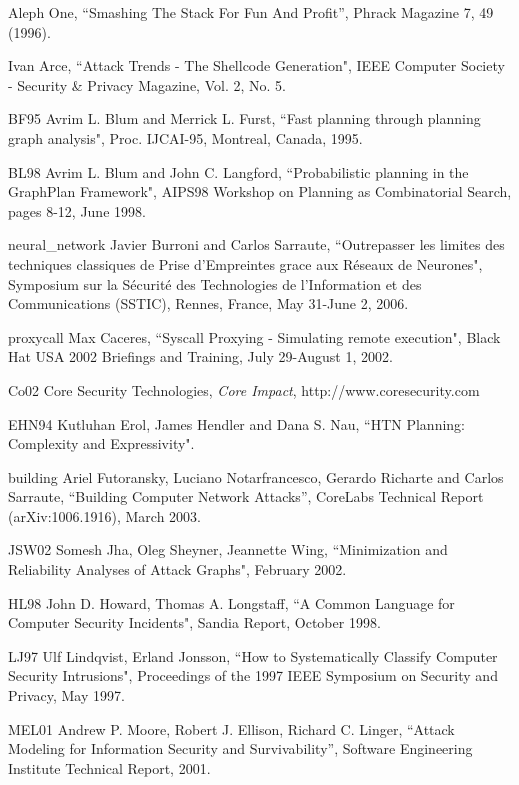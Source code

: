 \documentclass{llncs}
\begin{document}
\begin{thebibliography}{10}

  Aleph One,
``Smashing The Stack For Fun And Profit'',
Phrack Magazine 7, 49 (1996).

  Ivan Arce, 
``Attack Trends - The Shellcode Generation",
 IEEE Computer Society - Security \& Privacy Magazine, Vol. 2, No. 5.

\bibitem
{BF95}  Avrim L. Blum and Merrick L. Furst,
``Fast planning through planning graph analysis",
Proc. IJCAI-95, Montreal, Canada, 1995.

\bibitem
{BL98}  Avrim L. Blum and John C. Langford,
``Probabilistic planning in the GraphPlan Framework",
AIPS98 Workshop on Planning as Combinatorial Search, pages 8-12, June 1998.

\bibitem
{neural_network}  Javier Burroni and Carlos Sarraute,
``Outrepasser les limites des techniques classiques de Prise d'Empreintes grace aux R\'eseaux de Neurones",
Symposium sur la S\'ecurit\'e des Technologies de l'Information et des Communications (SSTIC), 
Rennes, France, May 31-June 2, 2006.

\bibitem
{proxycall}  Max Caceres, 
``Syscall Proxying - Simulating remote execution",
Black Hat USA 2002 Briefings and Training, July 29-August 1, 2002.

\bibitem
{Co02}  Core Security Technologies,
{\em Core Impact},
http://www.coresecurity.com
 
\bibitem
{EHN94}  Kutluhan Erol, James Hendler and Dana S. Nau,
``HTN Planning: Complexity and Expressivity".

\bibitem
{building}  Ariel Futoransky, Luciano Notarfrancesco, Gerardo Richarte and Carlos Sarraute, 
``Building Computer Network Attacks'', 
CoreLabs Technical Report (arXiv:1006.1916), March 2003.

\bibitem
{JSW02}  Somesh Jha, Oleg Sheyner, Jeannette Wing,
``Minimization and Reliability Analyses of Attack Graphs",
February 2002.

\bibitem
{HL98}  John D. Howard, Thomas A. Longstaff, 
``A Common Language for Computer Security Incidents", 
Sandia Report, October 1998.

\bibitem
{LJ97}  Ulf Lindqvist, Erland Jonsson,
``How to Systematically Classify Computer Security Intrusions",
Proceedings of the 1997 IEEE Symposium on Security
and Privacy, May 1997.

\bibitem
{MEL01} Andrew P. Moore, Robert J. Ellison, Richard C. Linger,
``Attack Modeling for Information Security and Survivability'',
Software Engineering Institute Technical Report, 2001.


\end{thebibliography}
\end{document}
